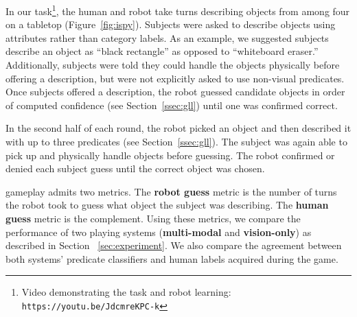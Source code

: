 In our \ispy task\footnote{Video demonstrating the \ispy task and robot learning: \texttt{https://youtu.be/JdcmreKPC-k}}, the human and robot take turns describing objects from among four on a tabletop (Figure~\ref{fig:ispy}).
Subjects were asked to describe objects using attributes rather than category labels.
As an example, we suggested subjects describe an object as ``black rectangle'' as opposed to ``whiteboard eraser.''
Additionally, subjects were told they could handle the objects physically before offering a description, but were not explicitly asked to use non-visual predicates.
Once subjects offered a description, the robot guessed candidate objects in order of computed confidence (see Section~\ref{ssec:gll}) until one was confirmed correct.

In the second half of each round, the robot picked an object and then described it with up to three predicates (see Section~\ref{ssec:gll}).
The subject was again able to pick up and physically handle objects before guessing.
The robot confirmed or denied each subject guess until the correct object was chosen.

\ispy gameplay admits two metrics.
The \textbf{robot guess} metric is the number of turns the robot took to guess what object the subject was describing.
The \textbf{human guess} metric is the complement.
Using these metrics, we compare the performance of two \ispy playing systems (\textbf{multi-modal} and \textbf{vision-only}) as described in Section ~\ref{sec:experiment}.
We also compare the agreement between both systems' predicate classifiers and human labels acquired during the game.